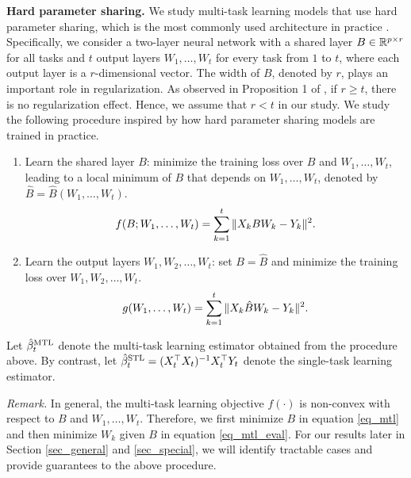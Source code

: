 \medskip
\noindent\textbf{Hard parameter sharing.}
We study multi-task learning models that use hard parameter sharing, which is the most commonly used architecture in practice \cite{R17}.
Specifically, we consider a two-layer neural network with a shared layer $B\in\mathbb{R}^{p\times r}$ for all tasks and $t$ output layers $W_1, \dots, W_t$ for every task from $1$ to $t$, where each output layer is a $r$-dimensional vector.
The width of $B$, denoted by $r$, plays an important role in regularization.
As observed in Proposition 1 of \citet{WZR20}, if $r \ge t$, there is no regularization effect.
Hence, we assume that $r < t$ in our study.
We study the following procedure inspired by how hard parameter sharing models are trained in practice.
\begin{enumerate}
	\item Learn the shared layer $B$: minimize the training loss over $B$ and $W_1, \dots, W_t$, leading to a local minimum of $B$ that depends on $W_1, \dots, W_t$, denoted by $\hat{B} = \hat{B}(W_1, \dots, W_t)$.
		{\begin{align}\label{eq_mtl}
			f(B; W_1, \dots, W_t) = \sum_{k=1}^t \|X_k B W_k - Y_k\|^2.
		\end{align}}
	\item Learn the output layers $W_1, W_2, \dots, W_t$: set $B = \hat{B}$ and minimize the training loss over $W_1, W_2, \dots, W_t$.
		{\begin{align}\label{eq_mtl_eval}
			g(W_1, \dots, W_t) = \sum_{k=1}^t \|X_k \hat{B} W_k - Y_k\|^2.
		\end{align}}
\end{enumerate}
Let $\hat{\beta}_t^{\textup{MTL}}$ denote the multi-task learning estimator obtained from the procedure above.
By contrast, let $\hat{\beta}_t^{\textup{STL}} = (X_t^{\top}X_t)^{-1}X_t^{\top}{Y_t}$ denote the single-task learning estimator. %

\smallskip
\noindent\textit{Remark.}
In general, the multi-task learning objective $f(\cdot)$ is non-convex with respect to $B$ and $W_1, \dots, W_t$.
Therefore, we first minimize $B$ in equation \eqref{eq_mtl} and then minimize $W_k$ given $B$ in equation \eqref{eq_mtl_eval}.
For our results later in Section \ref{sec_general} and \ref{sec_special}, we will identify tractable cases and provide guarantees to the above procedure.


